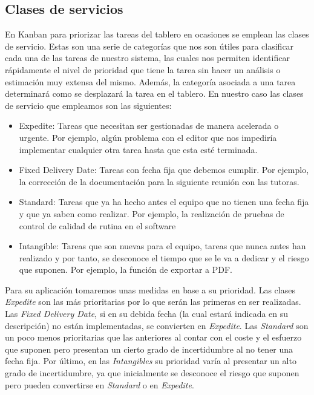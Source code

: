 \subsection{Clases de servicios}
\label{claseDeServicio}
En Kanban para priorizar las tareas del tablero en ocasiones se emplean las clases de servicio. Estas son una serie de categorías que nos son útiles para clasificar cada una de las tareas de nuestro sistema, las cuales nos permiten identificar rápidamente el nivel de prioridad que tiene la tarea sin hacer un análisis o estimación muy extensa del mismo. Además, la categoría asociada a una tarea determinará como se desplazará la tarea en el tablero. En nuestro caso las clases de servicio que empleamos son las siguientes:
\begin{itemize}
    \item Expedite: Tareas que necesitan ser gestionadas de manera acelerada o urgente. Por ejemplo, algún problema con el editor que nos impediría implementar cualquier otra tarea hasta que esta esté terminada.
    \item Fixed Delivery Date: Tareas con fecha fija que debemos cumplir. Por ejemplo, la corrección de la documentación para la siguiente reunión con las tutoras.
    \item Standard: Tareas que ya ha hecho antes el equipo que no tienen una fecha fija y que ya saben como realizar. Por ejemplo, la realización de pruebas de control de calidad de rutina en el software
    \item Intangible: Tareas que son nuevas para el equipo, tareas que nunca antes han realizado y por tanto, se desconoce el tiempo que se le va a dedicar y el riesgo que suponen. Por ejemplo, la función de exportar a PDF.
\end{itemize}

Para su aplicación tomaremos unas medidas en base a su prioridad. Las clases \textit{Expedite} son las más prioritarias por lo que serán las primeras en ser realizadas. Las \textit{Fixed Delivery Date}, si en su debida fecha (la cual estará indicada en su descripción) no están implementadas, se convierten en \textit{Expedite}. Las \textit{Standard} son un poco menos prioritarias que las anteriores al contar con el coste y el esfuerzo que suponen pero presentan un cierto grado de incertidumbre al no tener una fecha fija. Por último, en las \textit{Intangibles} su prioridad varía al presentar un alto grado de incertidumbre, ya que inicialmente se desconoce el riesgo que suponen pero pueden convertirse en \textit{Standard} o en \textit{Expedite}.


